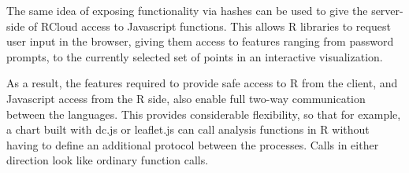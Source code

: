 The same idea of exposing functionality via hashes can be used to give
the server-side of RCloud access to Javascript functions. This allows
R libraries to request user input in the browser, giving them
access to features ranging from password prompts, to the currently
selected set of points in an interactive visualization.

As a result, the features required to provide safe access to R from
the client, and Javascript access from the R side, also enable
full two-way communication between the languages.  This provides
considerable flexibility, so that for example, a chart built with dc.js
or leaflet.js can call analysis functions in R without having
to define an additional protocol between the processes. Calls in either
direction look like ordinary function calls.
